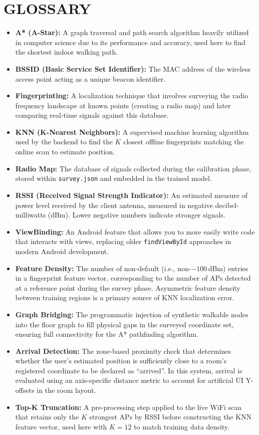 \documentclass[11pt,a4paper]{article}
\begin{document}
\section{GLOSSARY}
\begin{itemize}
\item \textbf{A* (A-Star):} A graph traversal and path search algorithm heavily utilized in computer science due to its performance and accuracy, used here to find the shortest indoor walking path.
\item \textbf{BSSID (Basic Service Set Identifier):} The MAC address of the wireless access point acting as a unique beacon identifier.
\item \textbf{Fingerprinting:} A localization technique that involves surveying the radio frequency landscape at known points (creating a radio map) and later comparing real-time signals against this database.
\item \textbf{KNN (K-Nearest Neighbors):} A supervised machine learning algorithm used by the backend to find the $K$ closest offline fingerprints matching the online scan to estimate position.
\item \textbf{Radio Map:} The database of signals collected during the calibration phase, stored within \texttt{survey.json} and embedded in the trained model.
\item \textbf{RSSI (Received Signal Strength Indicator):} An estimated measure of power level received by the client antenna, measured in negative decibel-milliwatts (dBm). Lower negative numbers indicate stronger signals.
\item \textbf{ViewBinding:} An Android feature that allows you to more easily write code that interacts with views, replacing older \texttt{findViewById} approaches in modern Android development.
\item \textbf{Feature Density:} The number of non-default (i.e., non-$-100$\,dBm) entries in a fingerprint feature vector, corresponding to the number of APs detected at a reference point during the survey phase. Asymmetric feature density between training regions is a primary source of KNN localization error.
\item \textbf{Graph Bridging:} The programmatic injection of synthetic walkable nodes into the floor graph to fill physical gaps in the surveyed coordinate set, ensuring full connectivity for the A* pathfinding algorithm.
\item \textbf{Arrival Detection:} The zone-based proximity check that determines whether the user's estimated position is sufficiently close to a room's registered coordinate to be declared as ``arrived''. In this system, arrival is evaluated using an axis-specific distance metric to account for artificial UI Y-offsets in the room layout.
\item \textbf{Top-K Truncation:} A pre-processing step applied to the live WiFi scan that retains only the $K$ strongest APs by RSSI before constructing the KNN feature vector, used here with $K = 12$ to match training data density.
\end{itemize}
\end{document}
